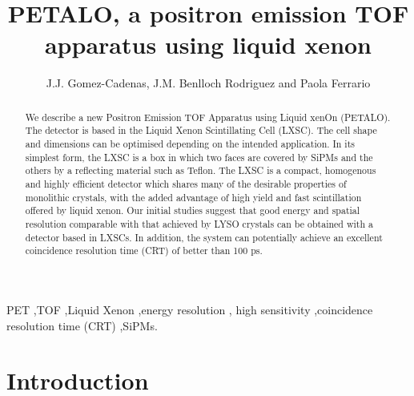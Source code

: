 \documentclass[review]{elsarticle}
\begin{document}
\begin{frontmatter}

\title{PETALO, a positron emission TOF apparatus using liquid xenon}

\author{J.J. Gomez-Cadenas, J.M. Benlloch Rodriguez and Paola Ferrario}
\address{IFIC (U. Valencia/CSIC)}

%
%

\begin{abstract}
We describe a new Positron Emission TOF Apparatus using Liquid xenOn (PETALO). The detector is based in the Liquid Xenon Scintillating Cell (LXSC). The cell shape and dimensions  can be optimised depending on the intended application. In its simplest form, the LXSC is a box in which two faces are covered by SiPMs and the others by a reflecting material such as Teflon. The LXSC is a compact, homogenous and highly efficient detector which shares many of the desirable properties of monolithic crystals, with the added advantage of high yield and fast scintillation offered by liquid xenon. Our initial studies suggest that good energy and spatial resolution comparable with that achieved by LYSO crystals can be obtained with a detector based in LXSCs. In addition, the system can potentially achieve an excellent coincidence resolution time (CRT) of better than 100 ps. 
\end{abstract}

\begin{keyword}
PET \sep TOF \sep Liquid Xenon \sep energy resolution \sep
 high sensitivity \sep coincidence resolution time (CRT) \sep SiPMs.
\end{keyword}

\end{frontmatter}



\section{Introduction}
\end{document}
